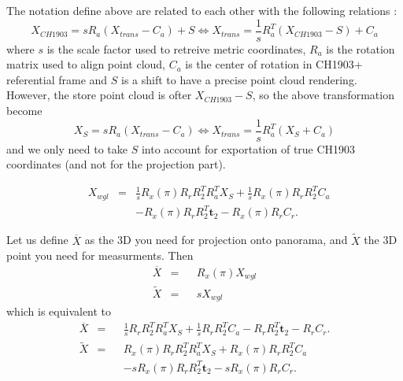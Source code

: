 \documentclass[a4paper, 11pt]{article}
\renewcommand{\tilde}{\widetilde}
\renewcommand{\t}{\mathbf{t}}
\begin{document}
   The notation define above are related to each other with the following relations :
   \begin{equation}
       X_{CH1903}  = s R_a ( X_{trans} - C_a ) + S \Leftrightarrow X_{trans} = \frac{1}{s} R_a^T ( X_{CH1903} -S ) + C_a
   \end{equation}
   where $s$ is the scale factor used to retreive metric coordinates, $R_a$ is the rotation matrix used to align
   point cloud, $C_a$ is the center of rotation in CH1903+ referential frame and $S$ is a shift to have a precise
   point cloud rendering. However, the store point cloud is ofter $X_{CH1903}-S$, so the above transformation become
      \begin{equation}
       X_{S}  = s R_a ( X_{trans} - C_a ) \Leftrightarrow X_{trans} = \frac{1}{s} R_a^T ( X_{S} + C_a )
   \end{equation}
   and we only need to take $S$ into account for exportation of true CH1903 coordinates (and not for the projection part).
   
   \begin{equation}
       \begin{aligned}
           & X_{wgl} & = & \frac{1}{s} R_x(\pi) R_r R_2^T R_a^T X_S + \frac{1}{s} R_x(\pi) R_r R_2^T C_a \\
            &&&       -R_x(\pi) R_r R_2^T \t_2 - R_x(\pi) R_r C_r.
       \end{aligned}
   \end{equation} 
   
   Let us define $\overline X $ as the 3D you need for projection onto panorama, and $\tilde X$ the 3D point you need 
   for measurments. Then 
   \begin{equation}
        \begin{aligned}
        \overline X & = && R_x(\pi) X_{wgl} \\
        \tilde X & = && s X_{wgl}
        \end{aligned}
   \end{equation}
   which is equivalent to 
      \begin{equation}
        \begin{aligned}
        \overline X & = && \frac{1}{s} R_r R_2^T R_a^T X_S + \frac{1}{s} R_r R_2^T C_a -R_r R_2^T \t_2 - R_r C_r. \\
        \tilde X & = && R_x(\pi) R_r R_2^T R_a^T X_S + R_x(\pi) R_r R_2^T C_a \\
            &&&       -s R_x(\pi) R_r R_2^T \t_2 - s R_x(\pi) R_r C_r.
        \end{aligned}
   \end{equation}
\end{document}
